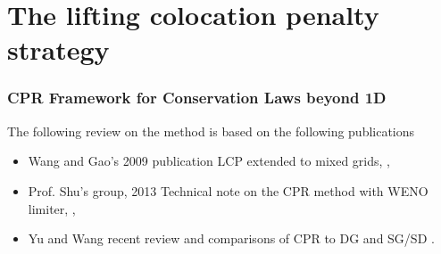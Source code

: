 \section{The lifting colocation penalty strategy}

\begin{frame} \frametitle{CPR Framework for Conservation Laws beyond 1D}
 The following review on the method is based on the following publications
 \begin{itemize}
  \item Wang and Gao's 2009 publication LCP extended to mixed grids, \cite{Wang&Gao2009},
  \item Prof. Shu's group, 2013 Technical note on the CPR method with WENO limiter, \cite{DuShu&Zhang2013},
  \item Yu and Wang recent review and comparisons of CPR to DG and SG/SD \cite{Yu&Wang2013}.
 \end{itemize}
\end{frame}